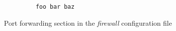 \documentclass[a4paper,11pt]{kth-bcs}
\begin{document}
   \begin{figure}[ht]
      \centering
      \label{fig:foo}
      \begin{verbatim}
         foo bar baz
      \end{verbatim}
      \caption{
         \small{
Port forwarding section in the \emph{firewall} configuration file
         }
      }
   \end{figure}
%



\end{document}
